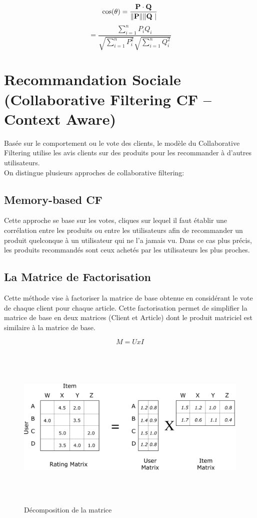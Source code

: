 $$\cos(\theta )={\mathbf {P} \cdot \mathbf {Q} \over \|\mathbf {P} \|\|\mathbf {Q} \ |}$$
 $$={\frac {\sum \limits _{i=1}^{n}{P_{i}Q_{i}}}{{\sqrt {\sum \limits _{i=1}^{n }{P_{i}^{2}}}}{\sqrt {\sum \limits _{i=1}^{n}{Q_{i}^{2}}}}}}$$
 
 \section{Recommandation Sociale (Collaborative Filtering CF – Context Aware)}
 Basée sur le comportement ou le vote des clients, le modèle du Collaborative Filtering utilise les avis clients sur des produits pour les recommander à d’autres utilisateurs.\\

On distingue plusieurs approches de collaborative filtering:\\
\subsection{Memory-based CF}
Cette approche se base sur les votes, cliques sur lequel il faut établir une corrélation entre les produits ou entre les utilisateurs afin de recommander un produit quelconque à un utilisateur qui ne l'a jamais vu. Dans ce cas plus précis, les produits recommandés sont ceux achetés par les utilisateurs les plus proches.
\subsection{La Matrice de Factorisation}
Cette méthode vise à factoriser la matrice de base obtenue en considérant le vote de chaque client pour chaque article. Cette factorisation permet de simplifier la matrice de base en deux matrices (Client et Article) dont le produit matriciel est similaire à la matrice de base.

$$M = U x I$$

\begin{figure}[h]
\begin{center}
\includegraphics[width=17cm,height=8cm]{images/factorisation_matrix.png}
\caption[Décomposition de la matrice]{Décomposition de la matrice}
\label{monlabel}
\end{center}
\end{figure}

